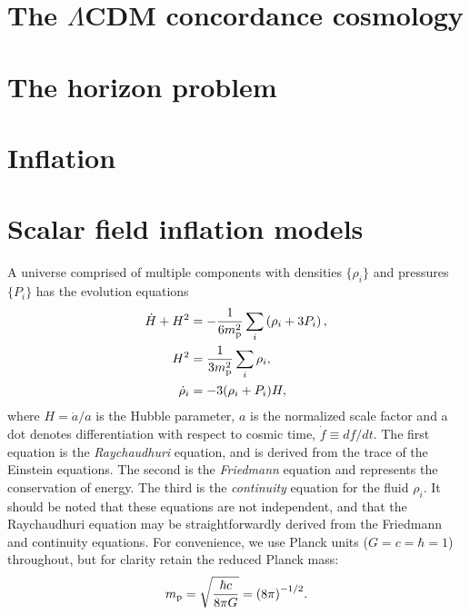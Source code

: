 \section{The $\Lambda$CDM concordance cosmology}

\section{The horizon problem}

\section{Inflation}


\clearpage{}

\section{Scalar field inflation models}
\label{sec:Scalar_field_inflation_models}
%
A universe comprised of multiple components  with densities
$\{\rho_i\}$ and pressures $\{P_i\}$ has the evolution equations
%
\begin{align}
  \dot{H}+H^2 &= 
  -\frac{1}{6m_{\mathrm{p}}^2}\sum\limits_i\left( \rho_i + 3P_i\right), 
  \label{eqn:Raychaudhuri_rho}
  \\
  H^2 &= 
  \frac{1}{3m_{\mathrm{p}}^2}\sum\limits_i \rho_i, 
  \\
  \dot{\rho}_i 
  &= -3(\rho_i + P_i)H,  
  \label{eqn:conservation}
\end{align}
%
where $H=\dot{a}/a$ is the Hubble parameter, $a$ is the normalized scale factor and a dot denotes differentiation with respect to cosmic time, $\dot{f}\equiv df/dt$. The first equation is the {\em Raychaudhuri\/} equation, and is derived from the trace of the Einstein equations. The second is the {\em Friedmann\/} equation and represents the conservation of energy. The third is the {\em continuity\/} equation for the fluid $\rho_i$. It should be noted that these equations are not independent, and that the Raychaudhuri equation may be straightforwardly derived from the Friedmann and continuity equations.  For convenience, we use Planck units ($G=c=\hbar=1$) throughout, but for clarity retain the reduced Planck mass: 
%
\[m_{\mathrm{p}} = \sqrt{\frac{\hbar c}{8\pi G}} = {(8\pi)}^{-1/2}.\]  
%


